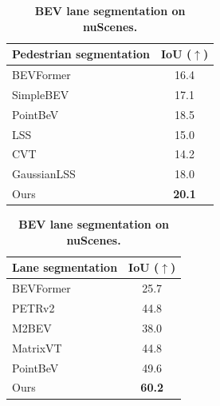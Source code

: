 \begin{table}[t]
\centering
\small

\begin{minipage}[htbp]{0.45\linewidth}
\centering
\caption{\textbf{BEV pedestrian segmentation on nuScenes.}}
\vspace{-0.5em}
{\setlength{\tabcolsep}{6pt}
\begin{tabular}{lc}
\toprule
\textbf{Pedestrian segmentation} & \textbf{IoU (\(\uparrow\))} \\
\midrule
BEVFormer \cite{li2024bevformer} & 16.4 \\
SimpleBEV \cite{harley2023simple} & 17.1 \\
PointBeV \cite{chambon2024pointbev} & 18.5 \\
LSS \cite{philion2020lift} & 15.0 \\
CVT \cite{zhou2022cross} & 14.2 \\
GaussianLSS \cite{lu2025toward} & 18.0 \\
Ours & \textbf{20.1} \\
\bottomrule
\end{tabular}}
\label{tab:pedestrian_segmentation}
\end{minipage}
\hfill
\begin{minipage}[htbp]{0.48\linewidth}
\centering
\caption{\textbf{BEV lane segmentation on nuScenes.}}
{\setlength{\tabcolsep}{6pt}
\begin{tabular}{lc}
\toprule
\textbf{Lane segmentation} & \textbf{IoU (\(\uparrow\))} \\
\midrule
BEVFormer \cite{li2024bevformer} & 25.7 \\
PETRv2 \cite{liu2023petrv2} & 44.8 \\
M2BEV \cite{philion2020lift} & 38.0 \\
MatrixVT \cite{zhou2022cross} & 44.8 \\
PointBeV \cite{chambon2024pointbev} & 49.6 \\
Ours & \textbf{60.2} \\
\bottomrule
\end{tabular}}
\label{tab:lane_segmentation}
\end{minipage}
\vspace{-1em}
\end{table}